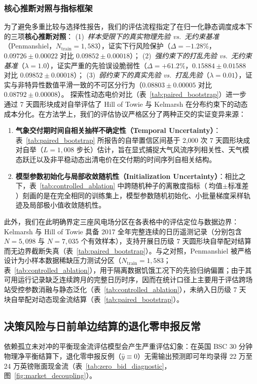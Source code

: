 \subsubsection{核心推断对照与指标框架}
为了避免多重比较与选择性报告，我们的评估流程指定了在归一化静态调度成本下的三项\textbf{核心推断对照}：
(1)~\textit{样本受限下的真实物理先验 vs.\ 无约束基准}（Penmanshiel，$N_{\text{train}}=1{,}583$），证实下行风险保护（$\Delta = -1.28\%$，$0.09726 \pm 0.00022$ 对比 $0.09852 \pm 0.00018$）；
(2)~\textit{强约束下的打乱先验 vs.\ 无约束基准}（$\lambda=1.0$），证实严重的先验误设脆弱性（$\Delta = +61.2\%$，$0.15884 \pm 0.01588$ 对比 $0.09852 \pm 0.00018$）；
(3)~\textit{弱约束下的真实先验 vs.\ 打乱先验}（$\lambda=0.01$），证实与非特异性数值平滑一致的不可区分行为（$0.08803 \pm 0.00005$ 对比 $0.08792 \pm 0.00008$）。
探索性动态电价对比（表~\ref{tab:paired_bootstrap}）进一步通过 7 天圆形块成对自举评估了 Hill of Towie 与 Kelmarsh 在分布约束下的动态成本分化。在方法学上，我们的评估协议严格区分了两种正交的实证变异来源：
\begin{enumerate}
    \item \textbf{气象交付期时间自相关抽样不确定性（Temporal Uncertainty）}：表~\ref{tab:paired_bootstrap} 所报告的自举置信区间基于 2,000 次 7 天圆形块成对自举（$L=1{,}008$ 步长）估计，旨在显式捕捉大气风流序列相关性、天气模态跃迁以及非平稳动态出清电价在交付期的时间序列自相关结构。
    \item \textbf{模型参数初始化与局部收敛随机性（Initialization Uncertainty）}：相比之下，表~\ref{tab:controlled_ablation} 中跨随机种子的离散度指标（$\text{均值} \pm \text{标准差}$）刻画的是在完全相同的训练集上，模型参数随机初始化、小批量梯度采样轨迹及局部极小值收敛随机性。
\end{enumerate}
此外，我们在此明确界定三座风电场分区在各表格中的评估定位与数据边界：Kelmarsh 与 Hill of Towie 具备 2017 全年完整连续的日历遥测记录（分别包含 $N=5{,}098$ 与 $N=7{,}035$ 个有效样本），支持开展日历级 7 天圆形块自举配对结算而无边界截断失真（表~\ref{tab:paired_bootstrap}）。与之对照，Penmanshiel 被严格设计为小样本数据稀缺压力测试分区（$N_{\text{train}}=1{,}583$；表~\ref{tab:controlled_ablation}），用于隔离数据饥饿工况下的先验归纳偏置；由于其可用运行记录缺乏连续跨月的完整日历时序，因而在统计口径上主要用于评估跨场站受控参数消融与静态泛化（表~\ref{tab:controlled_ablation}），未纳入日历级 7 天块自举配对动态现金流结算（表~\ref{tab:paired_bootstrap}）。



\subsection{决策风险与日前单边结算的退化零申报反常}
依赖孤立未对冲的平衡现金流评估模型会产生严重评估幻象：在英国 BSC 30 分钟物理净平衡结算下，退化零申报反例（$\hat{y} \equiv 0$）无需输出预测即可年均录得 22 万至 24 万英镑账面现金流（表~\ref{tab:zero_bid_diagnostic}，图~\ref{fig:market_decoupling}）。

